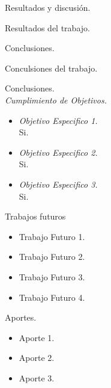\begin{frame}[t]{Resultados y discusión.}
    \begin{center}
        Resultados del trabajo.
    \end{center}
\end{frame}

\begin{frame}[t]{Conclusiones.}
    \begin{center}
        Conculsiones del trabajo.
    \end{center}
\end{frame}


\begin{frame}[t]{Conclusiones.\\\textit{Cumplimiento de Objetivos.}}
    \begin{center}
        \begin{itemize}
        \item \textit{Objetivo Especifico 1.}
        \pause
        \\Si.
        \pause
        \item \textit{Objetivo Especifico 2.}
        \pause
        \\Si.

        \item \textit{Objetivo Especifico 3.}
        \pause
        \\Si.
        \end{itemize}
    \end{center}
\end{frame}

\begin{frame}[t]{Trabajos futuros}
    \begin{center}
        \begin{itemize}
            \item Trabajo Futuro 1.
            \item Trabajo Futuro 2.
            \item Trabajo Futuro 3.
            \item Trabajo Futuro 4.
        \end{itemize}
    \end{center}
\end{frame}

\begin{frame}[c]{Aportes.}
    \begin{itemize}
        \item Aporte 1.
        \item Aporte 2.
        \item Aporte 3.
    \end{itemize}
\end{frame}
